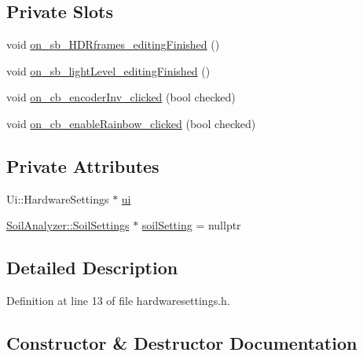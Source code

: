 \subsection*{Private Slots}
\begin{DoxyCompactItemize}
\item 
void \hyperlink{class_hardware_settings_a667f301ecd49dd8d8df164ec27568f91}{on\+\_\+sb\+\_\+\+H\+D\+Rframes\+\_\+editing\+Finished} ()
\item 
void \hyperlink{class_hardware_settings_a2eee1385ac9ad1ad88d04c7682ee8c2c}{on\+\_\+sb\+\_\+light\+Level\+\_\+editing\+Finished} ()
\item 
void \hyperlink{class_hardware_settings_a3127a1b2e53d6ac09e20391a0b6c9920}{on\+\_\+cb\+\_\+encoder\+Inv\+\_\+clicked} (bool checked)
\item 
void \hyperlink{class_hardware_settings_a4febc1e4a9e63c81ab74347bb1f66fe2}{on\+\_\+cb\+\_\+enable\+Rainbow\+\_\+clicked} (bool checked)
\end{DoxyCompactItemize}
\subsection*{Private Attributes}
\begin{DoxyCompactItemize}
\item 
Ui\+::\+Hardware\+Settings $\ast$ \hyperlink{class_hardware_settings_ae46cc8fe1f4247ab95bedf9bd5c14557}{ui}
\item 
\hyperlink{class_soil_analyzer_1_1_soil_settings}{Soil\+Analyzer\+::\+Soil\+Settings} $\ast$ \hyperlink{class_hardware_settings_a01cb694c4dbf49199d239a890639dce6}{soil\+Setting} = nullptr
\end{DoxyCompactItemize}


\subsection{Detailed Description}


Definition at line 13 of file hardwaresettings.\+h.



\subsection{Constructor \& Destructor Documentation}
\hypertarget{class_hardware_settings_a354b31caf3670eadd6b60cd6dd01c315}{}
